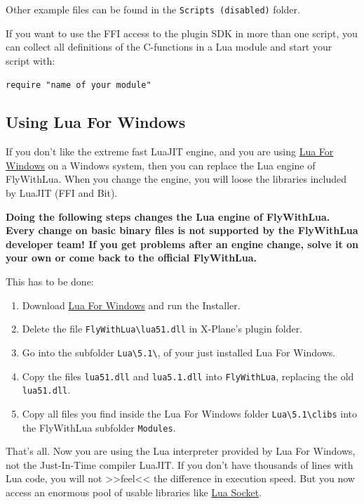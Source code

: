 \documentclass[11pt,parskip=half,a4paper]{scrartcl}
\begin{document}
Other example files can be found in the \verb|Scripts (disabled)| folder.

If you want to use the FFI access to the plugin SDK in more than one script, you can collect all definitions of the C-functions in a Lua module and start your script with:

\verb|require "name of your module"|

\newpage
\subsection{Using Lua For Windows}

If you don't like the extreme fast LuaJIT engine, and you are using \href{http://code.google.com/p/luaforwindows/}{Lua For Windows} on a Windows system, then you can replace the Lua engine of FlyWithLua. When you change the engine, you will loose the libraries included by LuaJIT (FFI and Bit).

\textbf{Doing the following steps changes the Lua engine of FlyWithLua. Every change on basic binary files is not supported by the FlyWithLua developer team! If you get problems after an engine change, solve it on your own or come back to the official FlyWithLua.}

This has to be done:

\begin{enumerate}
\item Download \href{http://code.google.com/p/luaforwindows/}{Lua For Windows} and run the Installer.
\item Delete the file \verb|FlyWithLua\lua51.dll| in X-Plane's plugin folder.
\item Go into the subfolder \verb|Lua\5.1\|, of your just installed Lua For Windows.
\item Copy the files \verb|lua51.dll| and \verb|lua5.1.dll| into \verb|FlyWithLua|, replacing the old \verb|lua51.dll|.
\item Copy all files you find inside the Lua For Windows folder \verb|Lua\5.1\clibs| into the FlyWithLua subfolder \verb|Modules|.
\end{enumerate}

That's all. Now you are using the Lua interpreter provided by Lua For Windows, not the Just-In-Time compiler LuaJIT. If you don't have thousands of lines with Lua code, you will not >>feel<< the difference in execution speed. But you now access an enormous pool of usable libraries like \href{http://w3.impa.br/~diego/software/luasocket/}{Lua Socket}.
\end{document}
